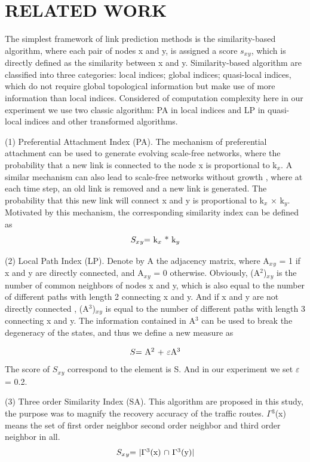 \documentclass[onecolumn,preprintnumbers,amsmath,amssymb]{revtex4}
\begin{document}
\section*{RELATED WORK\protect}
The simplest framework of link prediction methods is the similarity-based algorithm, where each pair of nodes x and y, is assigned a score $s_x$$_y$, which is directly defined as the similarity between x and y. Similarity-based algorithm are classified into three categories: local indices; global indices; quasi-local indices, which do not require global topological information but make use of more information than local indices\cite{SV}. Considered of computation complexity here in our experiment we use two classic algorithm: PA in local indices and LP in quasi-local indices and other transformed algorithms.

(1) Preferential Attachment Index (PA)\cite{WG}. The mechanism of preferential attachment can be used to generate evolving scale-free networks, where the probability that a new link is connected to the node x is proportional to k$_x$. A similar mechanism can also lead to scale-free networks without growth , where at each time step, an old link is removed and a new link is generated. The probability that this new link will connect x and y is proportional to k$_x$ × k$_y$. Motivated by this mechanism, the corresponding similarity index can be defined as
\begin{equation}
\centerline{
$S_x$$_y$=
k$_x$ * k$_y$
}
\end{equation}


(2) Local Path Index (LP)\cite{AC,LI}. Denote by A the adjacency matrix, where A$_x$$_y$ = 1 if x and y are directly connected, and A$_x$$_y$ = 0 otherwise. Obviously, (A$^2$)$_x$$_y$ is the number of common neighbors of nodes x and y, which is also equal to the number of different paths with length 2 connecting x and y. And if x and y are not directly connected , (A$^3$)$_x$$_y$ is equal to the number of different paths with length 3 connecting x and y. The information contained in A$^3$ can be used to break the degeneracy of the states, and thus we define a new measure as

\begin{equation}
\centerline{
$S$=
A$^2$ + $\varepsilon$A$^3$
}
\end{equation}
The score of $S_x$$_y$ correspond to the element is S. And in our experiment we set 
$\varepsilon$= 0.2.


(3) Three order Similarity Index (SA). This algorithm are proposed in this study, the purpose was to magnify the recovery accuracy of the traffic routes. $\Gamma$$^3$(x) means the set of first order neighbor second order neighbor and third order neighbor in all.
\begin{equation}
\centerline{
$S_x$$_y$=
$|$$\Gamma$$^3$(x) $\cap$ $\Gamma$$^3$(y)$|$
}
\end{equation}
\end{document}

